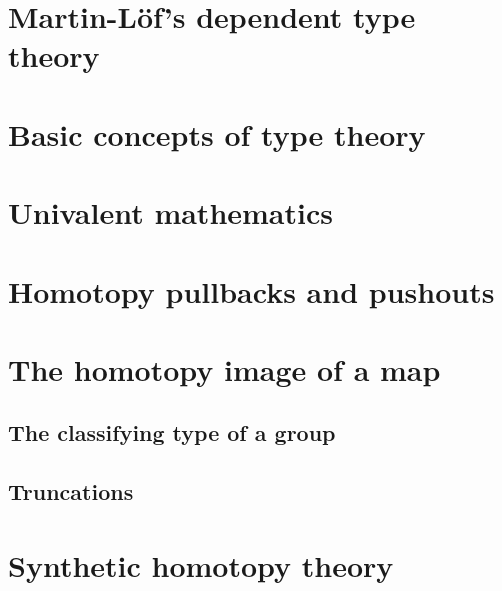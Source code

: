 \documentclass[11pt]{memoir} %
\begin{document}
\mainmatter

\renewcommand{\thechapter}{\Roman{chapter}}

\chapter{Martin-L\"of's dependent type theory}






\chapter{Basic concepts of type theory}






\chapter{Univalent mathematics}




\chapter{Homotopy pullbacks and pushouts}






\chapter{The homotopy image of a map}




\section{The classifying type of a group}

\section{Truncations}

\chapter{Synthetic homotopy theory}






%

\backmatter

\printbibliography

\printindex
\end{document}
